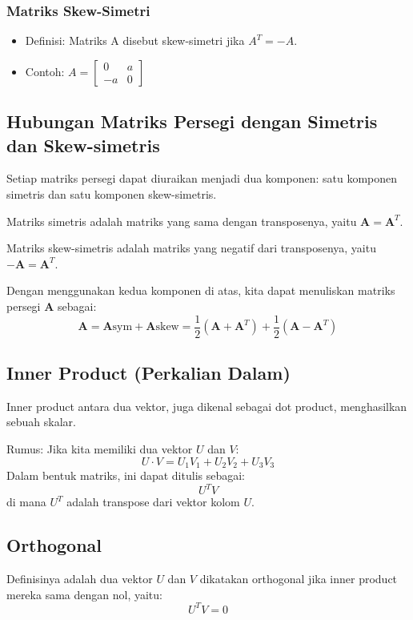 \documentclass{article}
\begin{document}
\subsubsection{Matriks Skew-Simetri}
\begin{itemize}
    \item Definisi: Matriks A disebut skew-simetri jika \( A^T = -A \).
    \item Contoh: \( A = \begin{bmatrix} 0 & a \\ -a & 0 \end{bmatrix} \)
\end{itemize}

\subsection{Hubungan Matriks Persegi dengan Simetris dan Skew-simetris}
Setiap matriks persegi dapat diuraikan menjadi dua komponen: satu komponen simetris dan satu komponen skew-simetris.

Matriks simetris adalah matriks yang sama dengan transposenya, yaitu \( \mathbf{A} = \mathbf{A}^T \).

Matriks skew-simetris adalah matriks yang negatif dari transposenya, yaitu \( -\mathbf{A} = \mathbf{A}^T \).

Dengan menggunakan kedua komponen di atas, kita dapat menuliskan matriks persegi \( \mathbf{A} \) sebagai: \[ \mathbf{A} = \mathbf{A}{\text{sym}} + \mathbf{A}{\text{skew}} = \frac{1}{2}(\mathbf{A} + \mathbf{A}^T) + \frac{1}{2}(\mathbf{A} - \mathbf{A}^T) \]

\subsection{Inner Product (Perkalian Dalam)}
Inner product antara dua vektor, juga dikenal sebagai dot product, menghasilkan sebuah skalar.

Rumus: Jika kita memiliki dua vektor \( U \) dan \( V \): \[ U \cdot V = U_1 V_1 + U_2 V_2 + U_3 V_3 \] Dalam bentuk matriks, ini dapat ditulis sebagai: \[ U^T V \] di mana \( U^T \) adalah transpose dari vektor kolom \( U \).

\subsection{Orthogonal}
Definisinya adalah dua vektor \( U \) dan \( V \) dikatakan orthogonal jika inner product mereka sama dengan nol, yaitu: \[ U^T V = 0 \]
\end{document}

